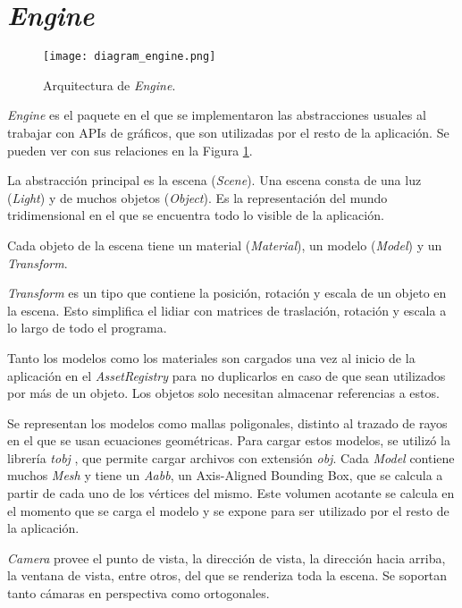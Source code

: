 \section{\textit{Engine}}

\begin{figure}[ht]
    \centering
    \texttt{[image: diagram\_engine.png]}
    \caption{Arquitectura de \textit{Engine}.}
    \label{fig:engine_architecture}
\end{figure}

\textit{Engine} es el paquete en el que se implementaron las abstracciones usuales al trabajar con APIs de gráficos, que son utilizadas por el resto de la aplicación.
Se pueden ver con sus relaciones en la Figura \ref{fig:engine_architecture}.

La abstracción principal es la escena (\textit{Scene}).
Una escena consta de una luz (\textit{Light}) y de muchos objetos (\textit{Object}).
Es la representación del mundo tridimensional en el que se encuentra todo lo visible de la aplicación.

Cada objeto de la escena tiene un material (\textit{Material}), un modelo (\textit{Model}) y un \textit{Transform}.

\textit{Transform} es un tipo que contiene la posición, rotación y escala de un objeto en la escena.
Esto simplifica el lidiar con matrices de traslación, rotación y escala a lo largo de todo el programa.

Tanto los modelos como los materiales son cargados una vez al inicio de la aplicación en el \textit{AssetRegistry} para no duplicarlos en caso de que sean utilizados por más de un objeto.
Los objetos solo necesitan almacenar referencias a estos.

Se representan los modelos como mallas poligonales, distinto al trazado de rayos en el que se usan ecuaciones geométricas.
Para cargar estos modelos, se utilizó la librería \textit{tobj} \cite{tobj-crate}, que permite cargar archivos con extensión \textit{obj}.
Cada \textit{Model} contiene muchos \textit{Mesh} y tiene un \textit{Aabb}, un Axis-Aligned Bounding Box, que se calcula a partir de cada uno de los vértices del mismo.
Este volumen acotante se calcula en el momento que se carga el modelo y se expone para ser utilizado por el resto de la aplicación.

\textit{Camera} provee el punto de vista, la dirección de vista, la dirección hacia arriba, la ventana de vista, entre otros, del que se renderiza toda la escena.
Se soportan tanto cámaras en perspectiva como ortogonales.

